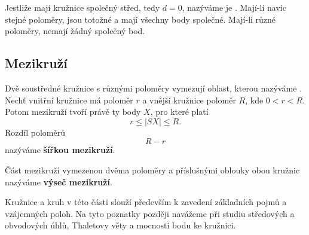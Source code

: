 \documentclass[12pt,a4paper]{article}
\begin{document}
Jestliže mají kružnice společný střed, tedy $d=0$, nazýváme je . Mají-li navíc stejné poloměry,
jsou totožné a mají všechny body společné. Mají-li různé poloměry, nemají žádný společný bod.

\subsection{Mezikruží}

Dvě soustředné kružnice s různými poloměry vymezují oblast, kterou nazýváme . Nechť vnitřní
kružnice má poloměr $r$ a vnější kružnice poloměr $R$, kde $0<r<R$. Potom mezikruží tvoří právě ty body $X$, pro které
platí
\[
    r\leq |SX|\leq R.
\]
Rozdíl poloměrů
\[
    R-r
\]
nazýváme \textbf{šířkou mezikruží}.

\begin{center}
\end{center}

Část mezikruží vymezenou dvěma poloměry a příslušnými oblouky obou kružnic nazýváme \textbf{výseč mezikruží}.

\begin{notebox}
    Kružnice a kruh v této části slouží především k zavedení základních pojmů a vzájemných poloh. Na tyto poznatky
    později navážeme při studiu středových a obvodových úhlů, Thaletovy věty a mocnosti bodu ke kružnici.
\end{notebox}





\exercisepart

\setcounter{section}{1}


\end{document}
